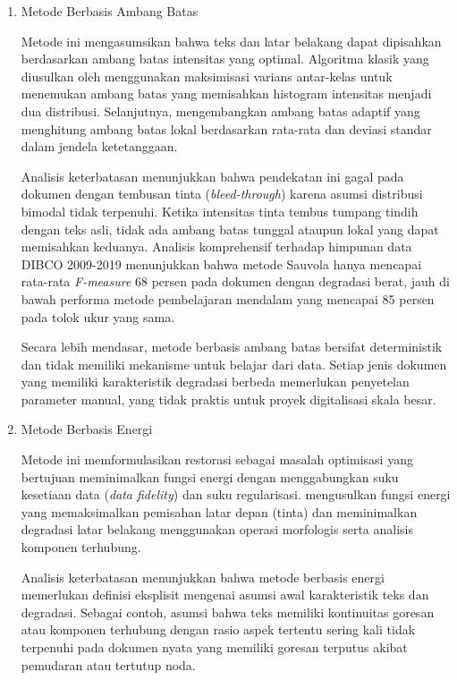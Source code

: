 \begin{enumerate}[leftmargin=*, labelindent=0pt, itemsep=1ex, topsep=0pt]

\item Metode Berbasis Ambang Batas
\label{para:metode-threshold}

Metode ini mengasumsikan bahwa teks dan latar belakang dapat dipisahkan berdasarkan ambang batas intensitas yang optimal. Algoritma klasik yang diusulkan oleh \parencite{otsu1979} menggunakan maksimisasi varians antar-kelas untuk menemukan ambang batas yang memisahkan histogram intensitas menjadi dua distribusi. Selanjutnya, \parencite{sauvola2000} mengembangkan ambang batas adaptif yang menghitung ambang batas lokal berdasarkan rata-rata dan deviasi standar dalam jendela ketetanggaan.

Analisis keterbatasan menunjukkan bahwa pendekatan ini gagal pada dokumen dengan tembusan tinta (\textit{bleed-through}) karena asumsi distribusi bimodal tidak terpenuhi. Ketika intensitas tinta tembus tumpang tindih dengan teks asli, tidak ada ambang batas tunggal ataupun lokal yang dapat memisahkan keduanya. Analisis komprehensif \parencite{pratikakis2013} terhadap himpunan data DIBCO 2009-2019 menunjukkan bahwa metode Sauvola hanya mencapai rata-rata \textit{F-measure} 68 persen pada dokumen dengan degradasi berat, jauh di bawah performa metode pembelajaran mendalam yang mencapai 85 persen pada tolok ukur yang sama.

Secara lebih mendasar, metode berbasis ambang batas bersifat deterministik dan tidak memiliki mekanisme untuk belajar dari data. Setiap jenis dokumen yang memiliki karakteristik degradasi berbeda memerlukan penyetelan parameter manual, yang tidak praktis untuk proyek digitalisasi skala besar.

\item Metode Berbasis Energi
\label{para:metode-energi}

Metode ini memformulasikan restorasi sebagai masalah optimisasi yang bertujuan meminimalkan fungsi energi dengan menggabungkan suku kesetiaan data (\textit{data fidelity}) dan suku regularisasi. \parencite{gatos2006} mengusulkan fungsi energi yang memaksimalkan pemisahan latar depan (tinta) dan meminimalkan degradasi latar belakang menggunakan operasi morfologis serta analisis komponen terhubung.

Analisis keterbatasan menunjukkan bahwa metode berbasis energi memerlukan definisi eksplisit mengenai asumsi awal karakteristik teks dan degradasi. Sebagai contoh, asumsi bahwa teks memiliki kontinuitas goresan atau komponen terhubung dengan rasio aspek tertentu sering kali tidak terpenuhi pada dokumen nyata yang memiliki goresan terputus akibat pemudaran atau tertutup noda.


\end{enumerate}
